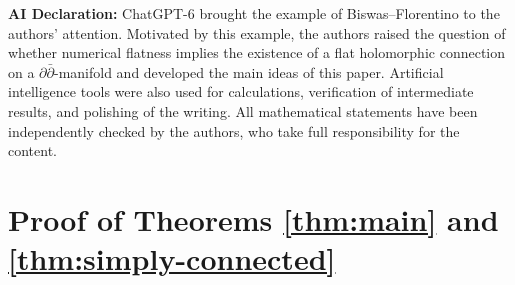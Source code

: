 \documentclass[11pt]{amsart}
\newcommand{\ddbar}{\partial\bar\partial}
\numberwithin{equation}{section}
\theoremstyle{definition}
\theoremstyle{plain}
\theoremstyle{plain}
\theoremstyle{definition}
\theoremstyle{stepstyle}
\begin{document}
	\vspace{.5cm}
	\noindent\textbf{AI Declaration:} 
	ChatGPT-6 brought the example of Biswas--Florentino \cite{BF}
	to the authors' attention.
	Motivated by this example, the authors raised the question of
	whether numerical flatness implies the existence of a flat
	holomorphic connection on a $\ddbar$-manifold and developed
	the main ideas of this paper.
	Artificial intelligence tools were also used for calculations,
	verification of intermediate results, and polishing of the writing.
	All mathematical statements have been independently checked
	by the authors, who take full responsibility for the content.
	
	\section{Proof of Theorems \ref{thm:main} and \ref{thm:simply-connected}}
	
\end{document}
